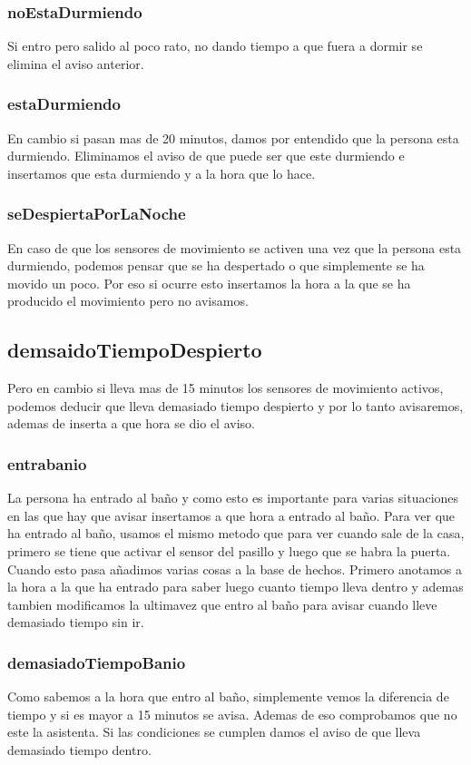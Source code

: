 \documentclass[12pt,a4paper]{article}
\begin{document}
\subsubsection{noEstaDurmiendo}
Si entro pero salido al poco rato, no dando tiempo a que fuera a dormir se elimina el aviso anterior. 
\subsubsection{estaDurmiendo}
En cambio si pasan mas de 20 minutos, damos por entendido que la persona esta durmiendo. Eliminamos el aviso de que puede ser que este durmiendo e insertamos que esta durmiendo y a la hora que lo hace.
\subsubsection{seDespiertaPorLaNoche}
En caso de que los sensores de movimiento se activen una vez que la persona esta durmiendo, podemos pensar que se ha despertado o que simplemente se ha movido un poco. Por eso si ocurre esto insertamos la hora a la que se ha producido el movimiento pero no avisamos. 
\subsection{demsaidoTiempoDespierto}
Pero en cambio si lleva mas de 15 minutos los sensores de movimiento activos, podemos deducir que lleva demasiado tiempo despierto y por lo tanto avisaremos, ademas de inserta a que hora se dio el aviso. 
\subsubsection{entrabanio}
La persona ha entrado al baño y como esto es importante para varias situaciones en las que hay que avisar insertamos a que hora a entrado al baño. Para ver que ha entrado al baño, usamos el mismo metodo que para ver cuando sale de la casa, primero se tiene que activar el sensor del pasillo y luego que se habra la puerta. Cuando esto pasa añadimos varias cosas a la base de hechos. Primero anotamos a la hora a la que ha entrado para saber luego cuanto tiempo lleva dentro y ademas tambien modificamos la ultimavez que entro al baño para avisar cuando lleve demasiado tiempo sin ir.
\subsubsection{demasiadoTiempoBanio}
Como sabemos a la hora que entro al baño, simplemente vemos la diferencia de tiempo y si es mayor a 15 minutos se avisa. Ademas de eso comprobamos que no este la asistenta. Si las condiciones se cumplen damos el aviso de que lleva demasiado tiempo dentro.
\end{document}
